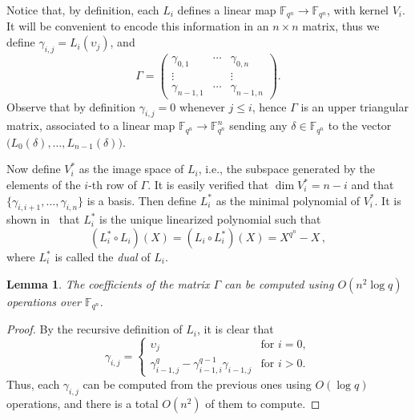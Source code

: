 \documentclass{sig-alternate}
\newcommand{\ff}[1]{\mathbb{F}_{#1}}
\newcommand{\qq}{q}
\newcommand{\nn}{n}
\newcommand{\qn}{{\qq^\nn}}
\newcommand{\extf}{\ff{\qn}}
\newtheorem{Lem}{Lemma}
\begin{document}
Notice that, by definition, each $L_i$ defines a linear map
$\extf\to\extf$, with kernel $V_i$. It will be convenient to encode
this information in an $\nn\times\nn$ matrix, thus we define
$\gamma_{i,j}=L_i(\upsilon_j)$, and
\begin{equation}
  \label{eq:Gamma}
  \Gamma =
  \begin{pmatrix}
    \gamma_{0,1} & \cdots & \gamma_{0,\nn}\\
    \vdots & & \vdots\\
    \gamma_{\nn-1,1} & \cdots & \gamma_{\nn-1,\nn}
  \end{pmatrix}.
\end{equation}
Observe that by definition $\gamma_{i,j}=0$ whenever $j\le i$, hence
$\Gamma$ is an upper triangular matrix, associated to a linear map
$\extf\to\extf^\nn$ sending any $\delta\in\extf$ to the vector
$\bigl(L_0(\delta),\dots,\allowbreak L_{n-1}(\delta)\bigr)$.  

Now define $V_i^\ast$ as the image space of $L_i$, i.e., the subspace
generated by the elements of the $i$-th row of $\Gamma$.  It is easily verified that
$\dim V_i^\ast=n-i$ and that $\{\gamma_{i,i+1},\dots,\gamma_{i,\nn}\}$
is a basis. Then define $L_i^\ast$ as the minimal polynomial of
$V_i^\ast$. It is shown in~\cite[Ch. 11]{mBER84a} that
$L_i^\ast$ is the unique linearized polynomial such that
\begin{equation}
\label{dual_polynomial}
(L_i^\ast \circ L_i)(X)=(L_i \circ L_i^\ast)(X)=X^\qn-X\,,
\end{equation}
where $L_i^\ast$ is called the \emph{dual} of $L_i$.

\begin{Lem}
  The coefficients of the matrix $\Gamma$ can be computed using
  $O(\nn^2\log\qq)$ operations over $\extf$.
\end{Lem}
\begin{proof}
  By the recursive definition of $L_i$, it is clear that
  \begin{equation}
    \gamma_{i,j} =
    \begin{cases}
      \upsilon_j &\text{for $i=0$},\\
      \gamma_{i-1,j}^\qq - \gamma_{i-1,i}^{\qq-1}\gamma_{i-1,j} &\text{for $i>0$}.
    \end{cases}
  \end{equation}
  Thus, each $\gamma_{i,j}$ can be computed from the previous ones
  using $O(\log\qq)$ operations, and there is a total $O(\nn^2)$ of
  them to compute.
\end{proof}
\end{document}
